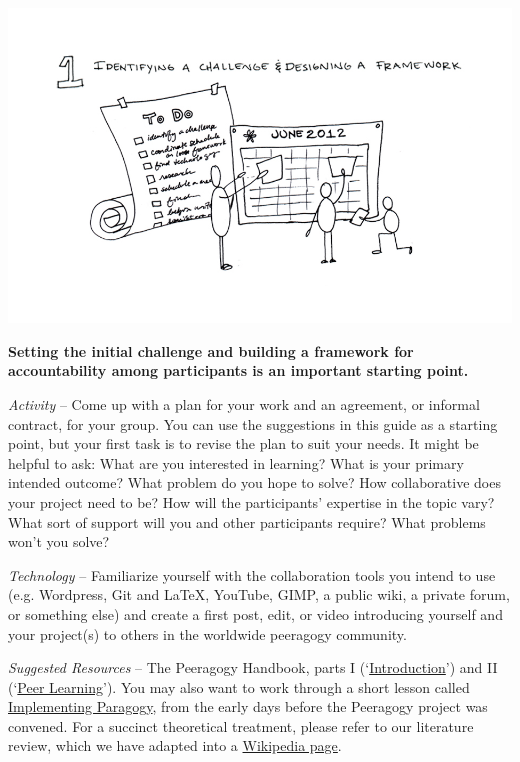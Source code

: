 \begin{center}
\includegraphics{../pictures/OpenBook-2-1.jpg}
\end{center}

\textbf{Setting the initial challenge and building a framework for
accountability among participants is an important starting point.}

\emph{Activity} -- Come up with a plan for your work and an agreement,
or informal contract, for your group. You can use the suggestions in
this guide as a starting point, but your first task is to revise the
plan to suit your needs. It might be helpful to ask: What are you
interested in learning? What is your primary intended outcome? What
problem do you hope to solve? How collaborative does your project need
to be? How will the participants' expertise in the topic vary? What sort
of support will you and other participants require? What problems won't
you solve?

\emph{Technology} -- Familiarize yourself with the collaboration tools
you intend to use (e.g. Wordpress, Git and LaTeX, YouTube, GIMP, a
public wiki, a private forum, or something else) and create a first
post, edit, or video introducing yourself and your project(s) to others
in the worldwide peeragogy community.

\emph{Suggested Resources} -- The Peeragogy Handbook, parts I
(`\href{http://peeragogy.org/}{Introduction}') and II
(`\href{http://peeragogy.org/peer-learning/}{Peer Learning}'). You may
also want to work through a short lesson called
\href{https://en.wikiversity.org/wiki/User:Arided/ImplementingParagogy}{Implementing
Paragogy}, from the early days before the Peeragogy project was
convened. For a succinct theoretical treatment, please refer to our
literature review, which we have adapted into a
\href{http://en.wikipedia.org/wiki/Peer\_learning}{Wikipedia page}.

